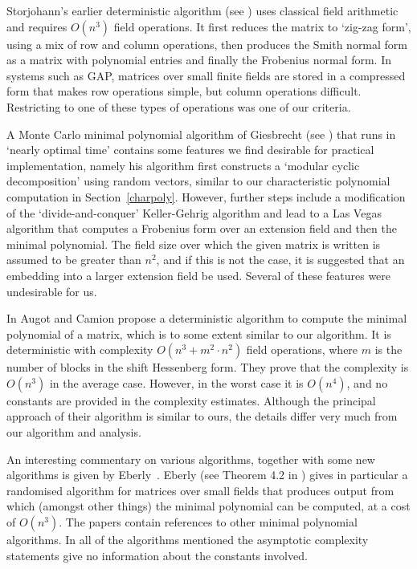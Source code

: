 Storjohann's earlier deterministic algorithm (see \cite{Stor98}) uses classical 
field arithmetic and requires $O(n^3)$ field operations. 
It first reduces the matrix to `zig-zag form', using a mix of row 
and column operations, then produces the Smith normal form 
as a matrix with polynomial entries and finally the Frobenius normal form.
In systems such as {\sf GAP}, matrices over small finite fields 
are stored in a compressed form that
makes row operations simple, but column operations difficult.
Restricting to one of these types of operations was one of our criteria.

A Monte Carlo minimal polynomial algorithm of Giesbrecht (see \cite{Gie95}) 
that runs in `nearly optimal time' contains some 
features we find desirable for practical implementation, namely 
his algorithm first constructs a `modular cyclic decomposition' 
using random vectors, similar to our characteristic polynomial 
computation in Section~\ref{charpoly}. However, further steps include a 
modification of the `divide-and-conquer' 
Keller-Gehrig algorithm \cite{KelG85} and lead to a 
Las Vegas algorithm that computes a Frobenius form over an extension 
field and then the minimal polynomial.
The field size over which the given matrix is written is assumed 
to be greater than $n^2$, and if this is not the case, it is 
suggested that an embedding into a larger extension field be used.
Several of these features were undesirable for us.

In \cite[Section 4]{AC97} Augot and Camion propose a deterministic algorithm
to compute the minimal polynomial of a matrix, which is to some extent
similar to our algorithm. It is deterministic with
complexity $O(n^3 + m^2 \cdot n^2)$ field operations, 
where $m$ is the number of blocks
in the shift Hessenberg form. They prove that the complexity is $O(n^3)$ in the
average case. However, in the worst case it is $O(n^4)$, and 
no constants are provided in the complexity estimates. Although the
principal approach of their algorithm is similar to ours, the details
differ very much from our algorithm and analysis.

An interesting commentary on various algorithms, together with some new 
algorithms is given by Eberly~\cite{Eb00}. Eberly (see Theorem 4.2
in \cite{Eb00}) gives in particular a randomised algorithm for matrices 
over small fields that produces output from which (amongst other things)
the minimal polynomial can be computed, at a cost of $O(n^3)$.
The papers \cite{Eb00,Gie95,Steel,Stor98,Stor01} contain references to other 
minimal polynomial algorithms.  In all of the algorithms mentioned 
the asymptotic complexity statements give no information about 
the constants involved. 

